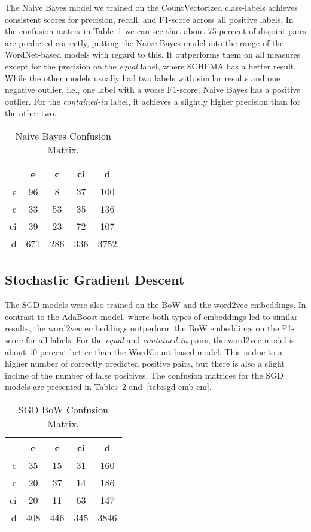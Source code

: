 The Naive Bayes model we trained on the CountVectorized class-labels achieves consistent scores for precision,
recall, and F1-score across all positive labels.
In the confusion matrix in Table~\ref{tab:naive-bayes-cm} we can see that about 75 percent of disjoint pairs are predicted
correctly, putting the Naive Bayes model into the range of the WordNet-based models with regard to this.
It outperforms them on all measures except for the precision on the \emph{equal} label, where SCHEMA has a better result.
While the other models usually had two labels with similar results and one negative outlier, i.e., one label with a
worse F1-score, Naive Bayes has a positive outlier.
For the \emph{contained-in} label, it achieves a slightly higher precision than for the other two.

\begin{table}[htbp]
 \begin{center}
  \begin{tabular}{r|cccc}
   & e & c & ci & d \\
   \hline
   e & 96 & 8 & 37 & 100 \\
   c & 33 & 53 & 35 & 136 \\
   ci & 39 & 23 & 72 & 107 \\
   d & 671 & 286 & 336 & 3752 \\
  \end{tabular}
  \caption{Naive Bayes Confusion Matrix.}
  \label{tab:naive-bayes-cm}
 \end{center}
\end{table}

\subsection{Stochastic Gradient Descent}

The SGD models were also trained on the BoW and the word2vec embeddings.
In contrast to the AdaBoost model, where both types of embeddings led to similar results, the word2vec embeddings
outperform the BoW embeddings on the F1-score for all labels.
For the \emph{equal} and \emph{contained-in} pairs, the word2vec model is about 10 percent better than the WordCount based model.
This is due to a higher number of correctly predicted positive pairs, but there is also a slight incline of
the number of false positives.
The confusion matrices for the SGD models are presented in Tables~\ref{tab:sgd-cm}
and~\ref{tab:sgd-emb-cm}.

\begin{table}[htbp]
 \begin{center}
  \begin{tabular}{r|cccc}
   & e & c & ci & d \\
   \hline
   e & 35 & 15 & 31 & 160 \\
   c & 20 & 37 & 14 & 186 \\
   ci & 20 & 11 & 63 & 147 \\
   d & 408 & 446 & 345 & 3846 \\
  \end{tabular}
  \caption{SGD BoW Confusion Matrix.}
  \label{tab:sgd-cm}
 \end{center}
\end{table}


